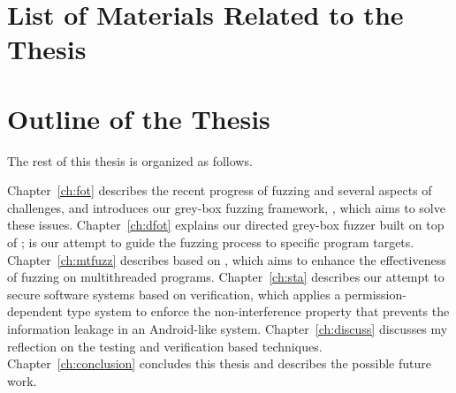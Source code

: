 \section{List of Materials Related to the Thesis}

\section{Outline of the Thesis}

The rest of this thesis is organized as follows.

Chapter~\ref{ch:fot} describes the recent progress of fuzzing and several aspects of challenges, and introduces our grey-box fuzzing framework, \FOT, which aims to solve these issues. Chapter~\ref{ch:dfot} explains our directed grey-box fuzzer \dFOT built on top of \FOT; \dFOT is our attempt to guide the fuzzing process to specific program targets. Chapter~\ref{ch:mtfuzz} describes \mtfuzz based on \FOT, which aims to enhance the effectiveness of fuzzing on multithreaded programs. Chapter~\ref{ch:sta} describes our attempt to secure software systems based on verification, which applies a permission-dependent type system to enforce the non-interference property that prevents the information leakage in an Android-like system. Chapter~\ref{ch:discuss} discusses my reflection on the testing and verification based techniques. Chapter~\ref{ch:conclusion} concludes this thesis and describes the possible future work.